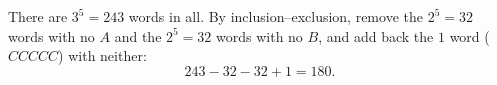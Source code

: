 There are $3^5=243$ words in all. By inclusion--exclusion, remove the $2^5=32$ words with no $A$ and the $2^5=32$ words with no $B$, and add back the $1$ word ($CCCCC$) with neither:
\[
243-32-32+1=\boxed{180}.
\]
